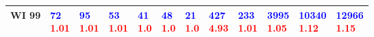 \begin{tabular}{llllllllllll}
WI 99 & \makecell{\textcolor{blue}{72} \\ \textcolor{red}{1.01}} & \makecell{\textcolor{blue}{95} \\ \textcolor{red}{1.01}} & \makecell{\textcolor{blue}{53} \\ \textcolor{red}{1.01}} & \makecell{\textcolor{blue}{41} \\ \textcolor{red}{1.0}} & \makecell{\textcolor{blue}{48} \\ \textcolor{red}{1.0}} & \makecell{\textcolor{blue}{21} \\ \textcolor{red}{1.0}} & \makecell{\textcolor{blue}{427} \\ \textcolor{red}{4.93}} & \makecell{\textcolor{blue}{233} \\ \textcolor{red}{1.01}} & \makecell{\textcolor{blue}{3995} \\ \textcolor{red}{1.05}} & \makecell{\textcolor{blue}{10340} \\ \textcolor{red}{1.12}} & \makecell{\textcolor{blue}{12966} \\ \textcolor{red}{1.15}} \\
\bottomrule
\end{tabular}
